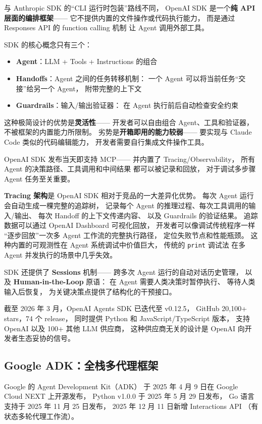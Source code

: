 与 Anthropic SDK 的“CLI 运行时包装”路线不同，
OpenAI SDK 是一个\textbf{纯 API 层面的编排框架}——
它不提供内置的文件操作或代码执行能力，
而是通过 Responses API 的 function calling 机制
让 Agent 调用外部工具。

SDK 的核心概念只有三个：
\begin{itemize}[noitemsep]
  \item \textbf{Agent}：LLM + Tools + Instructions 的组合
  \item \textbf{Handoffs}：Agent 之间的任务转移机制：
        一个 Agent 可以将当前任务“交接”给另一个 Agent，
        附带完整的上下文
  \item \textbf{Guardrails}：输入/输出验证器：
        在 Agent 执行前后自动检查安全约束
\end{itemize}

这种极简设计的优势是\textbf{灵活性}——
开发者可以自由组合 Agent、工具和验证器，
不被框架的内置能力所限制。
劣势是\textbf{开箱即用的能力较弱}——
要实现与 Claude Code 类似的代码编辑能力，
开发者需要自行集成文件操作工具。

OpenAI SDK 发布当天即支持 MCP——
并内置了 Tracing/Observability，
所有 Agent 的决策路径、工具调用和中间结果
都可以被记录和回放，
对于调试多步骤 Agent 任务至关重要。

\textbf{Tracing 架构}是 OpenAI SDK 相对于竞品的一大差异化优势。
每次 Agent 运行会自动生成一棵完整的追踪树，
记录每个 Agent 的推理过程、每次工具调用的输入/输出、
每次 Handoff 的上下文传递内容、
以及 Guardrails 的验证结果。
追踪数据可以通过 OpenAI Dashboard 可视化回放，
开发者可以像调试传统程序一样
“逐步回放”一次多 Agent 工作流的完整执行路径，
定位失败节点和性能瓶颈。
这种内置的可观测性在 Agent 系统调试中价值巨大，
传统的 \texttt{print} 调试法
在多 Agent 并发执行的场景中几乎失效。

SDK 还提供了 \textbf{Sessions} 机制——
跨多次 Agent 运行的自动对话历史管理，
以及 \textbf{Human-in-the-Loop} 原语：
在 Agent 需要人类决策时暂停执行、
等待人类输入后恢复，
为关键决策点提供了结构化的干预接口。

截至 2026 年 3 月，OpenAI Agents SDK 已迭代至 v0.12.5，
GitHub 20,100+ stars，74 个 release，
同时提供 Python 和 JavaScript/TypeScript 版本，
支持 OpenAI 以及 100+ 其他 LLM 供应商，
这种供应商无关的设计是 OpenAI 向开发者生态妥协的信号。

\subsection{Google ADK：全栈多代理框架}

Google 的 Agent Development Kit（ADK）
于 2025 年 4 月 9 日在 Google Cloud NEXT 上开源发布，
Python v1.0.0 于 2025 年 5 月 29 日发布，
Go 语言支持于 2025 年 11 月 25 日发布，
2025 年 12 月 11 日新增 Interactions API
（有状态多轮代理工作流）。

